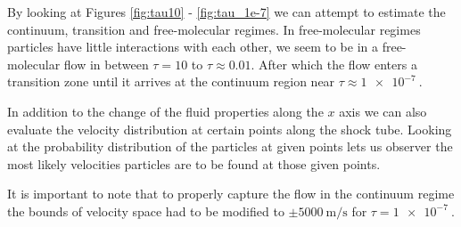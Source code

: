 \documentclass[paper=a4, fontsize=12pt]{scrartcl}
\begin{document}
\noindent
By looking at Figures \ref{fig:tau10} - \ref{fig:tau_1e-7} we can attempt to estimate the
continuum, transition and free-molecular regimes.
In free-molecular regimes particles have little interactions with each other, we seem to be in a
free-molecular flow in between $\tau = 10$ to $\tau \approx 0.01$.
After which the flow enters a transition zone until it arrives at the continuum region near
$\tau \approx \SI{1e-7}{}$.

\noindent
In addition to the change of the fluid properties along the $x$ axis we can also
evaluate the velocity distribution at certain points along the shock tube.
Looking at the probability distribution of the particles at given points lets us
observer the most likely velocities particles are to be found at those given points.

\noindent
It is important to note that to properly capture the flow in the continuum regime the bounds of velocity
space had to be modified to $\pm \SI{5000}{\meter \per \second}$
for $\tau = \SI{1e-7}{}$.
\end{document}
